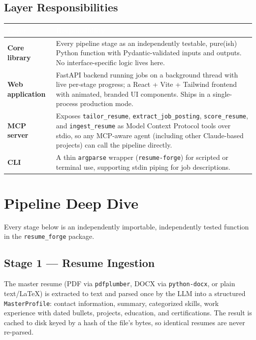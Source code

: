 \documentclass[10.5pt,letterpaper]{article}
\begin{document}
\subsection{Layer Responsibilities}
\begin{tabularx}{\textwidth}{@{}l X@{}}
\toprule
\rowcolor{brandIndigoDark}
\textcolor{white}{\textbf{Layer}} & \textcolor{white}{\textbf{Responsibility}} \\
\midrule
\textbf{Core library} & Every pipeline stage as an independently testable, pure(ish) Python
  function with Pydantic-validated inputs and outputs. No interface-specific logic lives
  here. \\
\rowcolor{brandBgGray}
\textbf{Web application} & FastAPI backend running jobs on a background thread with live
  per-stage progress; a React + Vite + Tailwind frontend with animated, branded UI
  components. Ships in a single-process production mode. \\
\textbf{MCP server} & Exposes \texttt{tailor\_resume}, \texttt{extract\_job\_posting},
  \texttt{score\_resume}, and \texttt{ingest\_resume} as Model Context Protocol tools over
  stdio, so any MCP-aware agent (including other Claude-based projects) can call the
  pipeline directly. \\
\rowcolor{brandBgGray}
\textbf{CLI} & A thin \texttt{argparse} wrapper (\texttt{resume-forge}) for scripted or
  terminal use, supporting stdin piping for job descriptions. \\
\bottomrule
\end{tabularx}

\newpage

\section{Pipeline Deep Dive}

Every stage below is an independently importable, independently tested function in the
\texttt{resume\_forge} package.

\subsection{Stage 1 --- Resume Ingestion}
The master resume (PDF via \texttt{pdfplumber}, DOCX via \texttt{python-docx}, or plain
text/\LaTeX) is extracted to text and parsed once by the LLM into a structured
\texttt{MasterProfile}: contact information, summary, categorized skills, work experience
with dated bullets, projects, education, and certifications. The result is cached to disk
keyed by a hash of the file's bytes, so identical resumes are never re-parsed.
\end{document}
